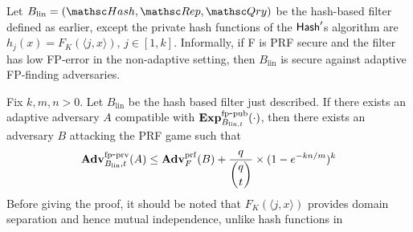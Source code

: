 \newcommand{\FK}{F_K(\langle j,x \rangle)}
\newcommand{\rhoK}{\rho(\langle j,x \rangle)}

Let $B_{\mathrm{lin}}=(\Hash,\Rep,\Qry)$ be the hash-based filter defined as earlier, except the private hash functions of the $\mathsf{Hash}'$s algorithm are $h_j(x) = \FK, \, j \in [1,k]$. Informally, if F is PRF secure and the filter has low FP-error in the non-adaptive setting, then $B_{\mathrm{lin}}$ is secure against adaptive FP-finding adversaries.
\begin{theorem}\label{thm2}
Fix $k,m,n >0$. Let $B_{\mathrm{lin}}$ be the hash based filter just described. If there exists an adaptive adversary $A$ compatible with $\mathrm{\mathbf{Exp}}^{\mathrm{fp\mbox{-}pub}}_{B_{\mathrm{lin},t}}(\cdot)$, then there exists an adversary $B$ attacking the PRF game such that
\begin{equation}
\mathrm{\mathbf{Adv}}^{\mathrm{fp\mbox{-}prv}}_{B_\mathrm{lin},t}(A)\leq  \mathbf{Adv}^{\mathrm{prf}}_{F}(B)  + \frac{q}{\dbinom{q}{t}} \times  (1-e^{-kn/m})^k
\end{equation}
Before giving the proof, it should be noted that $\FK$ provides domain separation and hence mutual independence, unlike hash functions in 
\end{theorem}

